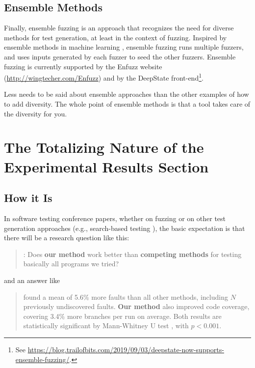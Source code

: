 \documentclass[sigplan]{acmart}
\begin{document}
\subsection{Ensemble Methods}

Finally, ensemble fuzzing \cite{chen2019enfuzz} is an approach that recognizes the need for
diverse methods for test generation, at least in the context of
fuzzing.   Inspired by ensemble methods in machine learning \cite{dietterich2002ensemble},
ensemble fuzzing runs multiple fuzzers, and uses inputs generated by
each fuzzer to seed the other fuzzers.  Ensemble fuzzing is currently
supported by the Enfuzz website  (\url{http://wingtecher.com/Enfuzz})
and by the DeepState front-end\footnote{See
\url{https://blog.trailofbits.com/2019/09/03/deepstate-now-supports-ensemble-fuzzing/}.}.

Less needs to be said about ensemble approaches than the other
examples of how to add diversity.  The whole point of ensemble methods
is that a tool takes care of the diversity for you.

\section{The Totalizing Nature of the Experimental Results Section}

\subsection{How it Is}

In software testing conference papers, whether on fuzzing or on other test
generation approaches (e.g., search-based testing \cite{McMinn04search-basedsoftware}), the basic
expectation is that there will be a research question like this:

\begin{quote}
:  Does {\bf our method} work better than {\bf competing
  methods} for testing basically all programs we tried?
\end{quote}

\noindent and an answer like

\begin{quote}
 found a mean of 5.6\% more faults than all
other methods, including $N$ previously undiscovered faults.  {\bf Our
  method} also improved code coverage, covering 3.4\% more branches
per run on average.  Both results are statistically significant by
Mann-Whitney U test \cite{arcuri2014hitchhiker}, with $p < 0.001$.
\end{quote}
\end{document}
